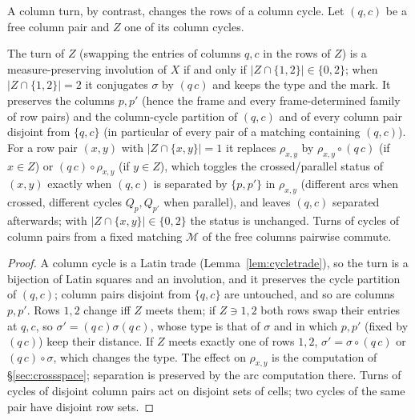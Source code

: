 A column turn, by contrast, changes the rows of a column cycle.  Let
$(q,c)$ be a free column pair and $Z$ one of its column cycles.

\begin{lemma}\label{lem:legalturn}
The turn of $Z$ (swapping the entries of columns $q,c$ in the rows of
$Z$) is a measure-preserving involution of $X$ if and only if
$|Z\cap\{1,2\}|\in\{0,2\}$; when $|Z\cap\{1,2\}|=2$ it conjugates
$\sigma$ by $(q\,c)$ and keeps the type and the mark.  It preserves the
columns $p,p'$ (hence the frame and every frame-determined family of
row pairs) and the column-cycle partition of $(q,c)$ and of every
column pair disjoint from $\{q,c\}$ (in particular of every pair of
a matching containing $(q,c)$).
For a row pair $(x,y)$ with $|Z\cap\{x,y\}|=1$ it replaces
$\rho_{x,y}$ by $\rho_{x,y}\circ(q\,c)$ (if $x\in Z$) or
$(q\,c)\circ\rho_{x,y}$ (if $y\in Z$), which toggles the
crossed/parallel status of $(x,y)$ exactly when $(q,c)$ is separated
by $\{p,p'\}$ in $\rho_{x,y}$ (different arcs when crossed, different
cycles $Q_p,Q_{p'}$ when parallel), and leaves $(q,c)$ separated
afterwards; with $|Z\cap\{x,y\}|\in\{0,2\}$ the status is unchanged.
Turns of cycles of column pairs from a fixed matching $\mathcal M$ of
the free columns pairwise commute.
\end{lemma}

\begin{proof}
A column cycle is a Latin trade (Lemma~\ref{lem:cycletrade}), so the
turn is a bijection of Latin squares and an involution, and it
preserves the cycle partition of $(q,c)$; column pairs disjoint from
$\{q,c\}$ are untouched, and so are columns $p,p'$.  Rows $1,2$ change
iff $Z$ meets them; if $Z\ni1,2$ both rows swap their entries at
$q,c$, so $\sigma'=(q\,c)\sigma(q\,c)$, whose type is that of $\sigma$
and in which $p,p'$ (fixed by $(q\,c)$) keep their distance.  If $Z$
meets exactly one of rows $1,2$, $\sigma'=\sigma\circ(q\,c)$ or
$(q\,c)\circ\sigma$, which changes the type.  The effect on
$\rho_{x,y}$ is the computation of \S\ref{sec:crossspace}; separation
is preserved by the arc computation there.  Turns of cycles of
disjoint column pairs act on disjoint sets of cells; two cycles of the
same pair have disjoint row sets.
\end{proof}

